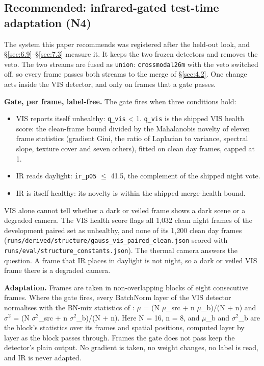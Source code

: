 \documentclass[10pt]{article}
\begin{document}
\subsection{Recommended: infrared-gated test-time adaptation (N4)}\label{sec:4.3}
The system this paper recommends was registered after the held-out look, and \S\ref{sec:6.9}--\S\ref{sec:7.3} measure it. It keeps the two frozen detectors and removes the veto. The two streams are fused as \texttt{union}: \texttt{crossmodal26m} with the veto switched off, so every frame passes both streams to the merge of \S\ref{sec:4.2}. One change acts inside the VIS detector, and only on frames that a gate passes.

\textbf{Gate, per frame, label-free.} The gate fires when three conditions hold:
\begin{itemize}
\item VIS reports itself unhealthy: \texttt{q\_\allowbreak{}vis} < 1. \texttt{q\_\allowbreak{}vis} is the shipped VIS health score: the clean-frame bound divided by the Mahalanobis novelty of eleven frame statistics (gradient Gini, the ratio of Laplacian to variance, spectral slope, texture cover and seven others), fitted on clean day frames, capped at 1.
\item IR reads daylight: \texttt{ir\_\allowbreak{}p05} $\leq$ 41.5, the complement of the shipped night vote.
\item IR is itself healthy: its novelty is within the shipped merge-health bound.
\end{itemize}

VIS alone cannot tell whether a dark or veiled frame shows a dark scene or a degraded camera. The VIS health score flags all 1,032 clean night frames of the development paired set as unhealthy, and none of its 1,200 clean day frames (\texttt{runs/\allowbreak{}derived/\allowbreak{}structure/\allowbreak{}gauss\_\allowbreak{}vis\_\allowbreak{}paired\_\allowbreak{}clean.json} scored with \texttt{runs/\allowbreak{}eval/\allowbreak{}structure\_\allowbreak{}constants.json}). The thermal camera answers the question. A frame that IR places in daylight is not night, so a dark or veiled VIS frame there is a degraded camera.

\textbf{Adaptation.} Frames are taken in non-overlapping blocks of eight consecutive frames. Where the gate fires, every BatchNorm layer of the VIS detector normalises with the BN-mix statistics of \citet{schneider2020improving}: $\mu$ = (N $\mu$\_src + n $\mu$\_b)/(N + n) and $\sigma$$^{2}$ = (N $\sigma$$^{2}$\_src + n $\sigma$$^{2}$\_b)/(N + n). Here N = 16, n = 8, and $\mu$\_b and $\sigma$$^{2}$\_b are the block's statistics over its frames and spatial positions, computed layer by layer as the block passes through. Frames the gate does not pass keep the detector's plain output. No gradient is taken, no weight changes, no label is read, and IR is never adapted.
\end{document}
